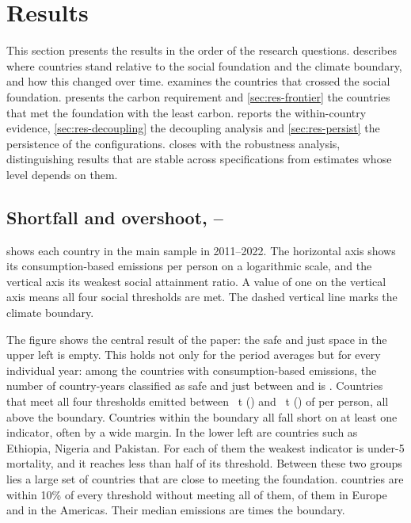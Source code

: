 \section{Results}\label{sec:results}

This section presents the results in the order of the research questions.  describes where countries stand relative to the social foundation and the climate boundary, and how this changed over time.  examines the countries that crossed the social foundation.  presents the carbon requirement and \cref{sec:res-frontier} the countries that met the foundation with the least carbon.  reports the within-country evidence, \cref{sec:res-decoupling} the decoupling analysis and \cref{sec:res-persist} the persistence of the configurations.  closes with the robustness analysis, distinguishing results that are stable across specifications from estimates whose level depends on them.

\subsection{Shortfall and overshoot, \nFirstYear--\nLastYear}\label{sec:res-config}

 shows each country in the main sample in 2011--2022. The horizontal axis shows its consumption-based \COtwo{} emissions per person on a logarithmic scale, and the vertical axis its weakest social attainment ratio. A value of one on the vertical axis means all four social thresholds are met. The dashed vertical line marks the climate boundary.

The figure shows the central result of the paper: the safe and just space in the upper left is empty. This holds not only for the period averages but for every individual year: among the \nNCons{} countries with consumption-based emissions, the number of country-years classified as safe and just between \nShareYearStart{} and \nLastYear{} is \nNEverSafeYears. Countries that meet all four thresholds emitted between \nFrontierMin~t (\nFrontierMinCountry) and \nMetMaxCons~t (\nMetMaxCountry) of \COtwo{} per person, all above the boundary. Countries within the boundary all fall short on at least one indicator, often by a wide margin. In the lower left are countries such as Ethiopia, Nigeria and Pakistan. For each of them the weakest indicator is under-5 mortality, and it reaches less than half of its threshold. Between these two groups lies a large set of countries that are close to meeting the foundation. \nNearN{} countries are within 10\% of every threshold without meeting all of them, \nNearEurope{} of them in Europe and \nNearAmerica{} in the Americas. Their median emissions are \nNearMedianMultiple{} times the boundary.

